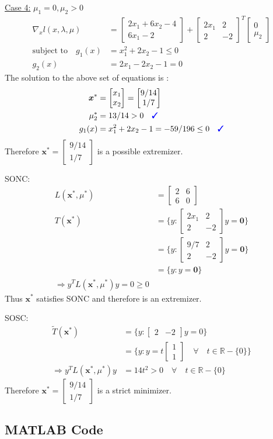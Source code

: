 \documentclass[a4paper,11pt]{article}
\newcommand{\V}[1]{\boldsymbol{#1}}
\newcommand{\mat}[1]{\begin{bmatrix}#1\end{bmatrix}}
\newcommand{\cmark}{{\color{blue}\text{\ding{51}}}}%
\begin{document}
\noindent\underline{Case 4:} $\mu_1=0, \mu_2>0$
\begin{align*}
 \nabla_x l(x,\lambda,\mu) &= \mat{2x_1 +6x_2 -4\\ 6x_1 -2} +
\mat{2x_1 & 2\\ 2&  -2}^T\mat{0\\ \mu_2}\\
% 
 \text{subject to}\quad g_1(x)&=x_1^2 +2x_2-1 \leq 0\\
 g_2(x)&=2x_1-2x_2-1= 0
\end{align*}
The solution to the above set of equations is :
\begin{align*}
 \V{x}^*&=\mat{x_1\\x_2} = \mat{9/14\\1/7}\\
 \mu_2^*&=13/14 >0 \quad \cmark\\
 g_1(x)&=x_1^2 +2x_2-1 = -59/196\leq 0 \quad \cmark\\
\end{align*}
Therefore $\V{x}^*=\mat{9/14\\1/7}$ is a possible extremizer. 

\noindent SONC: 
\begin{align*}
 L(\V{x}^*,\mu^*) &= \mat{2&6\\6&0}\\
 T(\V{x}^*) &=\{y: \mat{2x_1& 2\\2& -2}y = \V{0}\}\\
 &=\{y: \mat{9/7& 2\\2& -2}y = \V{0}\}\\
 &= \{y: y=\V{0}\}\\
 \Rightarrow y^TL(\V{x}^*,\mu^*)y = 0 \geq 0
\end{align*}
Thus $\V{x}^*$ satisfies SONC and therefore is an extremizer. 

\noindent SOSC:
\begin{align*}
 \tilde{T}(\V{x}^*) &= \{y:\mat{2&-2}y = 0\}\\
 &= \{y:y=t\mat{1\\1} \quad \forall \quad t\in \mathbb{R} -\{0\}\}\\
 \Rightarrow y^TL(\V{x}^*,\mu^*)y &= 14t^2>0 \quad \forall \quad t\in \mathbb{R} -\{0\}
\end{align*}
Therefore $\V{x}^*=\mat{9/14\\1/7}$ is a strict minimizer.




\newpage
\subsection*{MATLAB Code}
%
\end{document}
